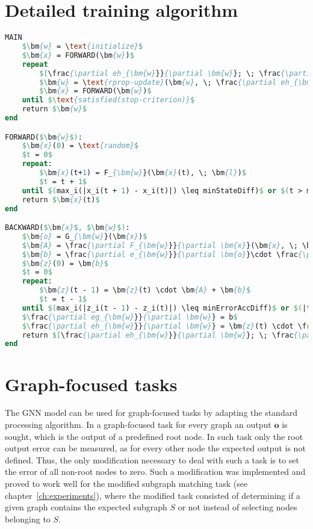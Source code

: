 \section{Detailed training algorithm}
\begin{lstlisting}[mathescape, style=outcode, language=pascal, caption=The learning algorithm]
MAIN
	$\bm{w} = \text{initialize}$
	$\bm{x} = FORWARD(\bm{w})$
	repeat
		$[\frac{\partial eh_{\bm{w}}}{\partial \bm{w}}; \; \frac{\partial eg_{\bm{w}}}{\partial \bm{w}}] = BACKWARD(\bm{x}, \; \bm{w})$
		$\bm{w} = \text{rprop-update}(\bm{w}, \; \frac{\partial eh_{\bm{w}}}{\partial \bm{w}}, \; \frac{\partial eg_{\bm{w}}}{\partial \bm{w}})$
		$\bm{x} = FORWARD(\bm{w})$
	until $\text{satisfied(stop-criterion)}$
	return $\bm{w}$
end

FORWARD($\bm{w}$):
	$\bm{x}(0) = \text{random}$
	$t = 0$
	repeat:
		$\bm{x}(t+1) = F_{\bm{w}}(\bm{x}(t), \; \bm{l})$
		$t = t + 1$
	until $(max_i(|x_i(t + 1) - x_i(t)|) \leq minStateDiff)$ or $(t > maxForwardSteps)$
	return $\bm{x}(t)$
end

BACKWARD($\bm{x}$, $\bm{w}$):
	$\bm{o} = G_{\bm{w}}(\bm{x})$
	$\bm{A} = \frac{\partial F_{\bm{w}}}{\partial \bm{x}}(\bm{x}, \; \bm{l})$
	$\bm{b} = \frac{\partial e_{\bm{w}}}{\partial \bm{o}}\cdot \frac{\partial G_{\bm{w}}}{\partial x}(\bm{x})$
	$\bm{z}(0) = \bm{b}$
	$t = 0$
	repeat:
		$\bm{z}(t - 1) = \bm{z}(t) \cdot \bm{A} + \bm{b}$
		$t = t - 1$
	until $(max_i(|z_i(t - 1) - z_i(t)|) \leq minErrorAccDiff)$ or $(|t| > maxBackwardSteps)$
	$\frac{\partial eg_{\bm{w}}}{\partial \bm{w}} = b$
	$\frac{\partial eh_{\bm{w}}}{\partial \bm{w}} = \bm{z}(t) \cdot \frac{\partial F_{\bm{w}}}{\partial \bm{w}}(\bm{x}, \bm{l}) + \frac{\partial p_{\bm{w}}}{\partial \bm{w}}$
	return $[\frac{\partial eh_{\bm{w}}}{\partial \bm{w}}; \; \frac{\partial eg_{\bm{w}}}{\partial \bm{w}}]$
end
\end{lstlisting}

\section{Graph-focused tasks}
The GNN model can be used for graph-focused tasks by adapting the standard processing algorithm. In a graph-focused task for every graph an output $\bm{o}$ is sought, which is the output of a predefined root node. In such task only the root output error can be measured, as for every other node the expected output is not defined. Thus, the only modification necessary to deal with such a task is to set the error of all non-root nodes to zero. Such a modification was implemented and proved to work well for the modified subgraph matching task (see chapter~\ref{ch:experiments}), where the modified task consisted of determining if a given graph contains the expected subgraph $S$ or not instead of selecting nodes belonging to $S$.
